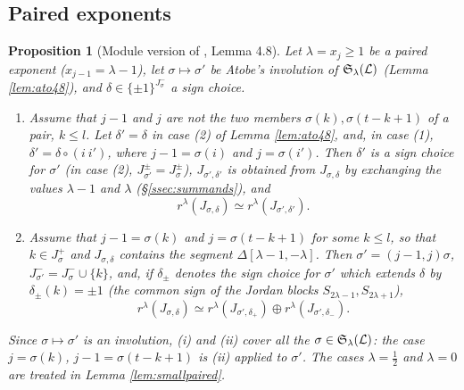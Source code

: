 \documentclass[a4paper,12pt,leqno]{amsart}
\theoremstyle{plain}
\newtheorem{prop}[thm]{Proposition}
\theoremstyle{definition}
\providecommand{\frS}{\mathfrak{S}}\providecommand{\frs}{\mathfrak{s}}
\begin{document}
\subsection{Paired exponents}\label{ssec:paired}
\begin{prop}[Module version of \cite{Ato24}, Lemma 4.8]\label{prop:cat48} Let $\lambda=x_j\geq1$ be a
paired exponent ($x_{j-1}=\lambda-1$), let $\sigma\mapsto\sigma'$ be Atobe's involution of
$\frS_\lambda(\caL)$ (Lemma \ref{lem:ato48}), and $\delta\in\{\pm1\}^{J^-_\sigma}$ a sign choice.
\begin{enumerate}
\item[(i)] Assume that $j-1$ and $j$ are not the two members $\sigma(k),\sigma(t-k+1)$ of a pair,
$k\leq l$. Let $\delta'=\delta$ in case (2) of Lemma \ref{lem:ato48}, and, in case (1),
$\delta'=\delta\circ(i\ i')$, where $j-1=\sigma(i)$ and $j=\sigma(i')$. Then $\delta'$ is a sign choice for
$\sigma'$ (in case (2), $J^\pm_{\sigma'}=J^\pm_\sigma$), $J_{\sigma',\delta'}$ is obtained from $J_{\sigma,\delta}$ by
exchanging the values $\lambda-1$ and $\lambda$ (\S\ref{ssec:summands}), and
\[r^\lambda(J_{\sigma,\delta})\simeq r^\lambda(J_{\sigma',\delta'}).\]
\item[(ii)] Assume that $j-1=\sigma(k)$ and $j=\sigma(t-k+1)$ for some $k\leq l$, so that $k\in J^+_\sigma$ and
$J_{\sigma,\delta}$ contains the segment $\Delta[\lambda-1,-\lambda]$. Then $\sigma'=(j-1,j)\sigma$,
$J^-_{\sigma'}=J^-_\sigma\cup\{k\}$, and, if $\delta_\pm$ denotes the sign choice for $\sigma'$ which extends
$\delta$ by $\delta_\pm(k)=\pm1$ (the common sign of the Jordan blocks $S_{2\lambda-1},S_{2\lambda+1}$),
\[r^\lambda(J_{\sigma,\delta})\simeq r^\lambda(J_{\sigma',\delta_+})\oplus r^\lambda(J_{\sigma',\delta_-}).\]
\end{enumerate}
Since $\sigma\mapsto\sigma'$ is an involution, (i) and (ii) cover all the $\sigma\in\frS_\lambda(\caL)$: the case
$j=\sigma(k)$, $j-1=\sigma(t-k+1)$ is (ii) applied to $\sigma'$. The cases $\lambda=\tfrac12$ and $\lambda=0$
are treated in Lemma \ref{lem:smallpaired}.
\end{prop}
\end{document}
